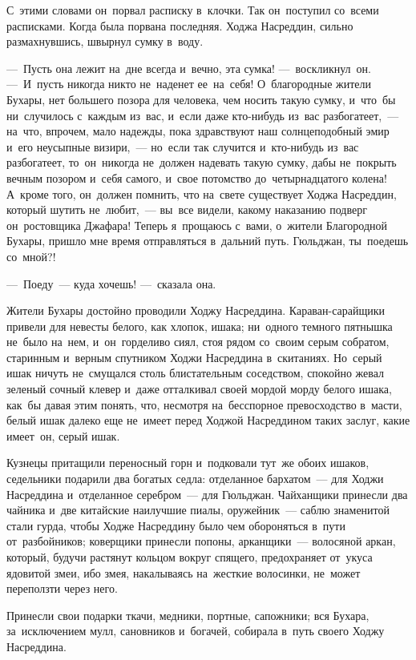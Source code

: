 \documentclass[12pt,a4paper]{book}
\begin{document}
С~этими словами он~порвал расписку в~клочки. Так он~поступил со~всеми расписками. Когда была порвана последняя. Ходжа Насреддин, сильно размахнувшись, швырнул сумку в~воду.

—~Пусть она лежит на~дне всегда и~вечно, эта сумка! —~воскликнул~он. —~И~пусть никогда никто не~наденет ее~на~себя! О~благородные жители Бухары, нет большего позора для человека, чем носить такую сумку, и~что~бы ни~случилось с~каждым из~вас, и~если даже кто-нибудь из~вас разбогатеет,~— на~что, впрочем, мало надежды, пока здравствуют наш солнцеподобный эмир и~его неусыпные визири,~— но~если так случится и~кто-нибудь из~вас разбогатеет, то~он~никогда не~должен надевать такую сумку, дабы не~покрыть вечным позором и~себя самого, и~свое потомство до~четырнадцатого колена! А~кроме того, он~должен помнить, что на~свете существует Ходжа Насреддин, который шутить не~любит,~— вы~все видели, какому наказанию подверг он~ростовщика Джафара! Теперь я~прощаюсь с~вами, о~жители Благородной Бухары, пришло мне время отправляться в~дальний путь. Гюльджан, ты~поедешь со~мной?!

—~Поеду~— куда хочешь! —~сказала она.

Жители Бухары достойно проводили Ходжу Насреддина. Караван-сарайщики привели для невесты белого, как хлопок, ишака; ни~одного темного пятнышка не~было на~нем, и~он~горделиво сиял, стоя рядом со~своим серым собратом, старинным и~верным спутником Ходжи Насреддина в~скитаниях. Но~серый ишак ничуть не~смущался столь блистательным соседством, спокойно жевал зеленый сочный клевер и~даже отталкивал своей мордой морду белого ишака, как~бы давая этим понять, что, несмотря на~бесспорное превосходство в~масти, белый ишак далеко еще не~имеет перед Ходжой Насреддином таких заслуг, какие имеет~он, серый ишак.

Кузнецы притащили переносный горн и~подковали тут~же обоих ишаков, седельники подарили два богатых седла: отделанное бархатом~— для Ходжи Насреддина и~отделанное серебром~— для Гюльджан. Чайханщики принесли два чайника и~две китайские наилучшие пиалы, оружейник~— саблю знаменитой стали гурда, чтобы Ходже Насреддину было чем обороняться в~пути от~разбойников; коверщики принесли попоны, арканщики~— волосяной аркан, который, будучи растянут кольцом вокруг спящего, предохраняет от~укуса ядовитой змеи, ибо змея, накалываясь на~жесткие волосинки, не~может переползти через него.

Принесли свои подарки ткачи, медники, портные, сапожники; вся Бухара, за~исключением мулл, сановников и~богачей, собирала в~путь своего Ходжу Насреддина.
\end{document}
